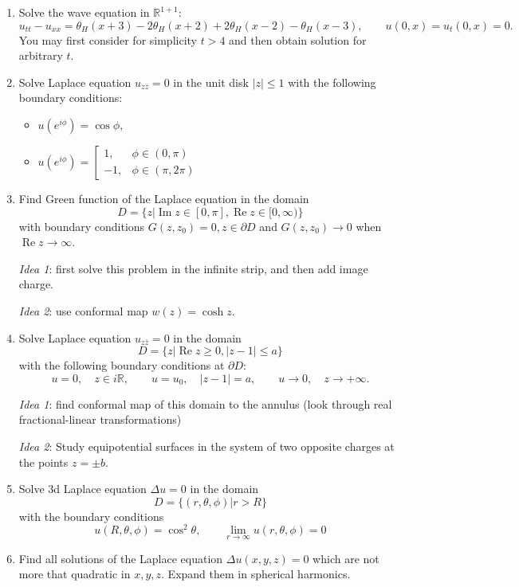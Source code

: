 \documentclass[a4paper,11pt]{article}
\newcommand{\im}{\operatorname{Im}}
\newcommand{\re}{\operatorname{Re}}
\begin{document}
\begin{enumerate}
\item\label{item:20} Solve the wave equation in \(\mathbb{R}^{1+1}\):
\[
u_{tt}-u_{xx}=\theta_H(x+3)-2\theta_H(x+2)+2\theta_H(x-2)-\theta_H(x-3),\qquad u(0,x)=u_t(0,x)=0.
\]
You may first consider for simplicity \(t>4\) and then obtain solution for arbitrary \(t\).

\item\label{item:23} Solve Laplace equation \(u_{z\bar{z}}=0\) in the unit disk \(|z|\le 1\) with the following boundary conditions:
\begin{itemize}
\item \(
u(e^{i\phi})=\cos\phi,
\)
\item \(u(e^{i\phi})=\left[\begin{array}{ll}1, & \phi\in(0,\pi)\\-1, & \phi\in(\pi,2\pi)\end{array}\right.\)
\end{itemize}

\item\label{item:21} Find Green function of the Laplace equation in the domain \[D=\{z|\im z\in [0,\pi], \re z\in [0,\infty)\}\] with boundary conditions \(G(z,z_0)=0, z\in \partial D\) and \(G(z,z_0)\to 0\) when \(\re z\to \infty\).

\textit{Idea 1}: first solve this problem in the infinite strip, and then add image charge.

\textit{Idea 2}: use conformal map \(w(z)=\cosh z\).

\item\label{item:22} Solve Laplace equation \(u_{z\bar z}=0\) in the domain
\[
D=\{z|\re z\geq 0, |z-1|\le a\}
\]
with the following boundary conditions at \(\partial D\):
\[
u=0,\quad z\in i \mathbb{R},\qquad u=u_0,\quad |z-1|=a,\qquad u\to 0,\quad z\to +\infty.
\]

\textit{Idea 1}: find conformal map of this domain to the annulus (look through real fractional-linear transformations) 

\textit{Idea 2}: Study equipotential surfaces in the system of two opposite charges at the points \(z=\pm b\).


\item\label{item:24} Solve 3d Laplace equation \(\Delta u=0\) in the domain
\[
D=\{(r,\theta,\phi)|r>R\}
\]
with the boundary conditions
\[
u(R,\theta,\phi)=\cos^2\theta,\qquad \lim_{r\to \infty}u(r,\theta,\phi)=0
\]

\item\label{item:25} Find all solutions of the Laplace equation \(\Delta u(x,y,z) = 0\) which are not more that quadratic in \(x, y, z\). Expand them in spherical harmonics.



\end{enumerate}
\end{document}
